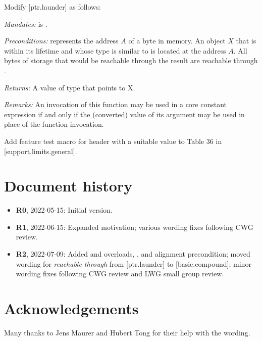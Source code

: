 Modify [ptr.launder] as follows:

\begin{adjustwidth}{0.5cm}{0.5cm}

  \emph{Mandates:}  is .

  \emph{Preconditions:}  represents the address $A$ of a byte in memory. An object $X$ that is within its lifetime and whose type is similar to  is located at the address $A$. All bytes of storage that would be reachable through  the result are reachable through  .

  \emph{Returns:} A value of type  that points to {X}.

  \emph{Remarks:} An invocation of this function may be used in a core constant expression if and only if the (converted) value of its argument may be used in place of the function invocation. 
\end{adjustwidth}

Add feature test macro
 for header  with a suitable value to
Table 36 in [support.limits.general].


\section*{Document history}

\begin{itemize}
\item \textbf{R0}, 2022-05-15: Initial version.
\item \textbf{R1}, 2022-06-15: Expanded motivation; various wording fixes following CWG review.
\item \textbf{R2}, 2022-07-09: Added  and  overloads, , and alignment precondition; moved wording for \emph{reachable through} from [ptr.launder] to [basic.compound]; minor wording fixes following CWG review and LWG small group review.
\end{itemize}


\section*{Acknowledgements}

Many thanks to Jens Maurer and Hubert Tong for their help with the wording.


\renewcommand{\bibname}{References}



